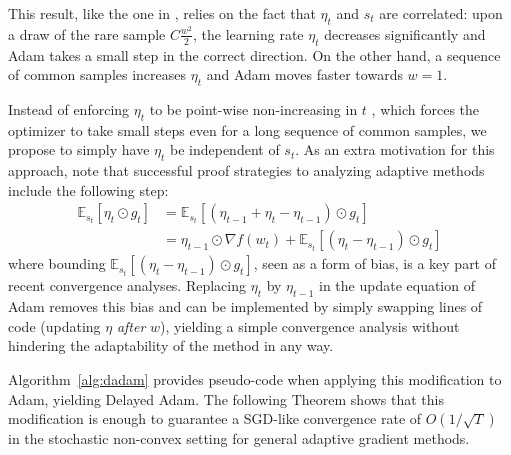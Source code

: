 \documentclass{article}
\newcommand{\currw}{w_t}
\newcommand{\w}{w}
\newcommand{\currg}{g_t}
\newcommand{\preve}{\eta_{t-1}}
\newcommand{\curre}{\eta_t}
\newcommand{\expec}[2]{\mathbb E_{#1} \left[ {#2} \right]}
\begin{document}
This result, like the one in \citet{amsgrad}, relies on the fact that $\curre$
and $s_t$ are correlated: upon a draw of the rare sample $C \frac{\w^2}2$, the
learning rate $\curre$ decreases significantly and Adam takes a small step in
the correct direction.  On the other hand, a sequence of common samples
increases $\curre$ and Adam moves faster towards $w=1$.

Instead of enforcing $\curre$ to be point-wise non-increasing in $t$
\citep{amsgrad}, which forces the optimizer to take small steps even for a long
sequence of common samples, we propose to simply have $\curre$ be independent
of $s_t$.  As an extra motivation for this approach, note that successful
proof strategies \citep{yogi} to analyzing adaptive methods include the
following step:
\begin{equation}
\begin{split}
   \expec{s_t}{\curre \odot \currg}
      &= \expec{s_t}{ \left(\preve + \curre - \preve \right) \odot \currg } \\
      &= \preve \odot \nabla f(\currw) +
         \expec{s_t}{ \left(\curre - \preve \right) \odot \currg}
\end{split}
\label{eq:proofstep}
\end{equation}
where bounding $\expec{s_t}{ \left(\curre - \preve \right) \odot \currg}$, seen
as a form of bias, is a key part of recent convergence analyses.  Replacing
$\curre$ by $\preve$ in the update equation of Adam removes this bias and can
be implemented by simply swapping lines of code (updating $\eta$ \textit{after}
$\w$), yielding a simple convergence analysis without hindering the adaptability of the method in any way.

Algorithm~\ref{alg:dadam} provides pseudo-code when applying this modification to Adam, yielding Delayed Adam.  The following Theorem shows that this
modification is enough to guarantee a SGD-like convergence rate of
$O(1 / \sqrt T)$ in the stochastic non-convex setting for general adaptive
gradient methods.
\end{document}
